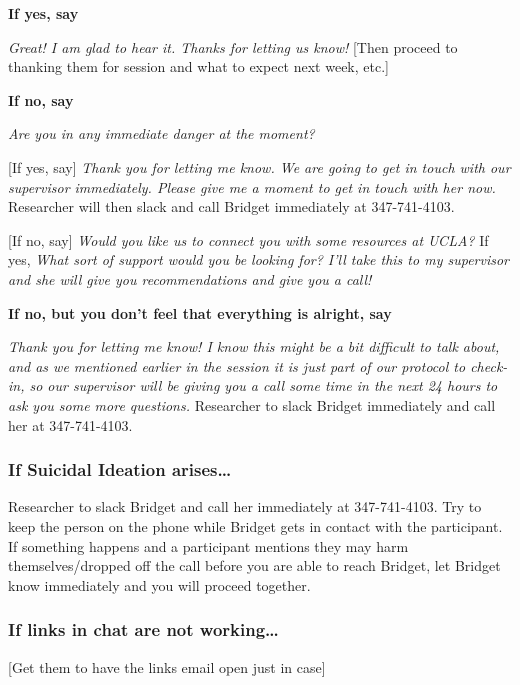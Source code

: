 \documentclass[]{book}
\begin{document}
\textbf{If yes, say}

\emph{Great! I am glad to hear it. Thanks for letting us know!} {[}Then proceed to thanking them for session and what to expect next week, etc.{]}

\textbf{If no, say}

\emph{Are you in any immediate danger at the moment?}

{[}If yes, say{]} \emph{Thank you for letting me know. We are going to get in touch with our supervisor immediately. Please give me a moment to get in touch with her now.} Researcher will then slack and call Bridget immediately at 347-741-4103.

{[}If no, say{]} \emph{Would you like us to connect you with some resources at UCLA?} If yes, \emph{What sort of support would you be looking for? I'll take this to my supervisor and she will give you recommendations and give you a call!}

\textbf{If no, but you don't feel that everything is alright, say}

\emph{Thank you for letting me know! I know this might be a bit difficult to talk about, and as we mentioned earlier in the session it is just part of our protocol to check-in, so our supervisor will be giving you a call some time in the next 24 hours to ask you some more questions.} Researcher to slack Bridget immediately and call her at 347-741-4103.

\hypertarget{if-suicidal-ideation-arises-1}{%
\subsubsection{If Suicidal Ideation arises\ldots{}}\label{if-suicidal-ideation-arises-1}}

Researcher to slack Bridget and call her immediately at 347-741-4103. Try to keep the person on the phone while Bridget gets in contact with the participant. If something happens and a participant mentions they may harm themselves/dropped off the call before you are able to reach Bridget, let Bridget know immediately and you will proceed together.

\hypertarget{if-links-in-chat-are-not-working-1}{%
\subsubsection{If links in chat are not working\ldots{}}\label{if-links-in-chat-are-not-working-1}}

{[}Get them to have the links email open just in case{]}
\end{document}
